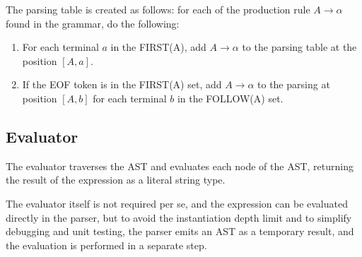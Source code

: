 The parsing table is created as follows: for each of the production rule $A \rightarrow \alpha$ found in the grammar, do the following:

\begin{enumerate}
  \item For each terminal $a$ in the FIRST(A), add $A \rightarrow \alpha$ to the parsing table at the position $[A, a]$.
  \item If the EOF token is in the FIRST(A) set, add $A \rightarrow \alpha$ to the parsing at position $[A, b]$ for each terminal $b$ in the FOLLOW(A) set.
\end{enumerate}

\subsection{Evaluator}

The evaluator traverses the AST and evaluates each node of the AST, returning the result of the expression as a literal string type.

The evaluator itself is not required per se, and the expression can be evaluated directly in the parser, but to avoid the instantiation depth limit and to simplify debugging and unit testing, the parser emits an AST as a temporary result, and the evaluation is performed in a separate step.
